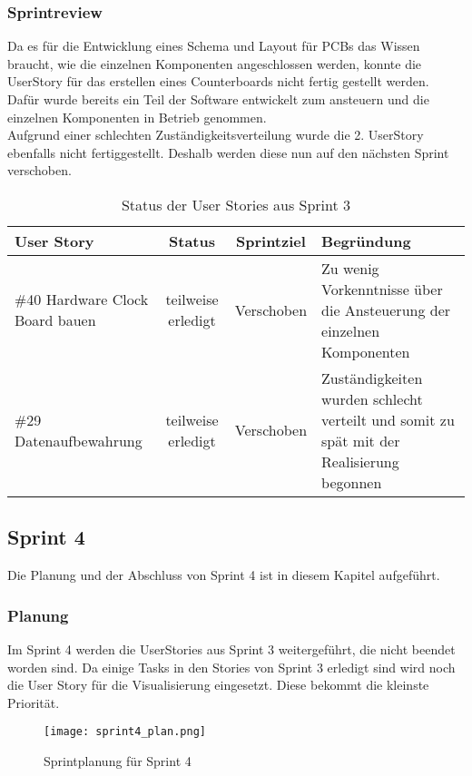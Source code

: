\subsubsection*{Sprintreview}
Da es für die Entwicklung eines Schema und Layout für PCBs das Wissen braucht, wie die einzelnen Komponenten angeschlossen werden, konnte die UserStory für das erstellen eines Counterboards nicht fertig gestellt werden. Dafür wurde bereits ein Teil der Software entwickelt zum ansteuern und die einzelnen Komponenten in Betrieb genommen.\\
Aufgrund einer schlechten Zuständigkeitsverteilung wurde die 2. UserStory ebenfalls nicht fertiggestellt. Deshalb werden diese nun auf den nächsten Sprint verschoben.
\begin{table}[H]
    \centering
    \begin{tabular}{p{4cm}ccp{7cm}}
        \textbf{User Story} &  \textbf{Status} & \textbf{Sprintziel}& \textbf{Begründung}\\\toprule[2pt]
        \#40 Hardware Clock Board bauen & teilweise erledigt & Verschoben & Zu wenig Vorkenntnisse über die Ansteuerung der einzelnen Komponenten\\
        \#29 Datenaufbewahrung & teilweise erledigt & Verschoben & Zuständigkeiten wurden schlecht verteilt und somit zu spät mit der Realisierung begonnen\\
    \end{tabular}
    \caption{Status der User Stories aus Sprint 3}
\end{table}

\clearpage
\subsection*{Sprint 4}
Die Planung und der Abschluss von Sprint 4 ist in diesem Kapitel aufgeführt.
\subsubsection*{Planung}
Im Sprint 4 werden die UserStories aus Sprint 3 weitergeführt, die nicht beendet worden sind. Da einige Tasks in den Stories von Sprint 3 erledigt sind wird noch die User Story für die Visualisierung eingesetzt. Diese bekommt die kleinste Priorität.
\begin{figure}[H]
    \centering
    \texttt{[image: sprint4\_plan.png]}
    \caption{Sprintplanung für Sprint 4}
\end{figure}

